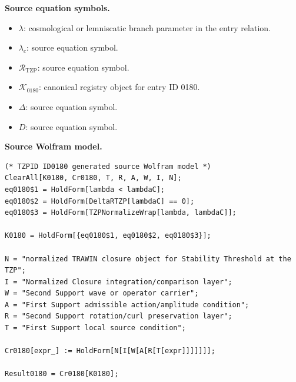 \begin{minipage}[t]{0.49\linewidth}
\begingroup
\small
\raggedright
\textbf{Source equation symbols.}\par
\begin{itemize}[leftmargin=1.35em,itemsep=1pt,topsep=1pt,parsep=0pt]
    \item $\lambda$: cosmological or lemniscatic branch parameter in the entry relation.
    \item $\lambda_c$: source equation symbol.
    \item $\mathcal{R}_{\mathrm{TZP}}$: source equation symbol.
    \item $\mathcal{K}_{0180}$: canonical registry object for entry ID 0180.
    \item $\Delta$: source equation symbol.
    \item $D$: source equation symbol.
\end{itemize}
\endgroup
\end{minipage}\hfill
\begin{minipage}[t]{0.47\linewidth}
\begingroup
\scriptsize
\raggedright
\textbf{Source Wolfram model.}\par
\begin{Verbatim}[fontsize=\tiny,breaklines=true,breakanywhere=true]
(* TZPID ID0180 generated source Wolfram model *)
ClearAll[K0180, Cr0180, T, R, A, W, I, N];
eq0180$1 = HoldForm[lambda < lambdaC];
eq0180$2 = HoldForm[DeltaRTZP[lambdaC] == 0];
eq0180$3 = HoldForm[TZPNormalizeWrap[lambda, lambdaC]];

K0180 = HoldForm[{eq0180$1, eq0180$2, eq0180$3}];

N = "normalized TRAWIN closure object for Stability Threshold at the TZP";
I = "Normalized Closure integration/comparison layer";
W = "Second Support wave or operator carrier";
A = "First Support admissible action/amplitude condition";
R = "Second Support rotation/curl preservation layer";
T = "First Support local source condition";

Cr0180[expr_] := HoldForm[N[I[W[A[R[T[expr]]]]]]];

Result0180 = Cr0180[K0180];
\end{Verbatim}
\endgroup
\end{minipage}

